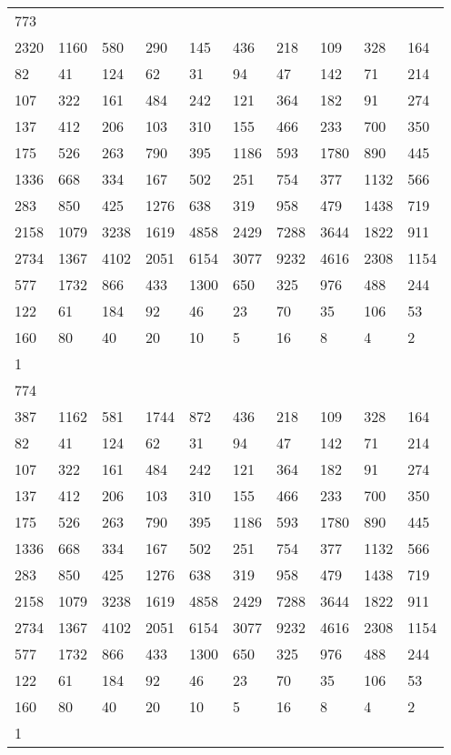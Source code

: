 \begin{longtable}{*{10}{l}}
773&&&&&&&&&\\
2320& 1160& 580& 290& 145& 436& 218& 109& 328& 164\\
82& 41& 124& 62& 31& 94& 47& 142& 71& 214\\
107& 322& 161& 484& 242& 121& 364& 182& 91& 274\\
137& 412& 206& 103& 310& 155& 466& 233& 700& 350\\
175& 526& 263& 790& 395& 1186& 593& 1780& 890& 445\\
1336& 668& 334& 167& 502& 251& 754& 377& 1132& 566\\
283& 850& 425& 1276& 638& 319& 958& 479& 1438& 719\\
2158& 1079& 3238& 1619& 4858& 2429& 7288& 3644& 1822& 911\\
2734& 1367& 4102& 2051& 6154& 3077& 9232& 4616& 2308& 1154\\
577& 1732& 866& 433& 1300& 650& 325& 976& 488& 244\\
122& 61& 184& 92& 46& 23& 70& 35& 106& 53\\
160& 80& 40& 20& 10& 5& 16& 8& 4& 2\\
1& \\

774&&&&&&&&&\\
387& 1162& 581& 1744& 872& 436& 218& 109& 328& 164\\
82& 41& 124& 62& 31& 94& 47& 142& 71& 214\\
107& 322& 161& 484& 242& 121& 364& 182& 91& 274\\
137& 412& 206& 103& 310& 155& 466& 233& 700& 350\\
175& 526& 263& 790& 395& 1186& 593& 1780& 890& 445\\
1336& 668& 334& 167& 502& 251& 754& 377& 1132& 566\\
283& 850& 425& 1276& 638& 319& 958& 479& 1438& 719\\
2158& 1079& 3238& 1619& 4858& 2429& 7288& 3644& 1822& 911\\
2734& 1367& 4102& 2051& 6154& 3077& 9232& 4616& 2308& 1154\\
577& 1732& 866& 433& 1300& 650& 325& 976& 488& 244\\
122& 61& 184& 92& 46& 23& 70& 35& 106& 53\\
160& 80& 40& 20& 10& 5& 16& 8& 4& 2\\
1& \\


\end{longtable}
